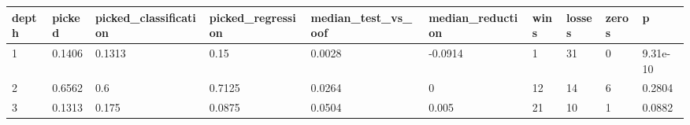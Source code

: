 \begin{tabular}{llllllllll}
\toprule
depth & picked & picked\_classification & picked\_regression & median\_test\_vs\_oof & median\_reduction & wins & losses & zeros & p \\
\midrule
1 & 0.1406 & 0.1313 & 0.15 & 0.0028 & -0.0914 & 1 & 31 & 0 & 9.31e-10 \\
2 & 0.6562 & 0.6 & 0.7125 & 0.0264 & 0 & 12 & 14 & 6 & 0.2804 \\
3 & 0.1313 & 0.175 & 0.0875 & 0.0504 & 0.005 & 21 & 10 & 1 & 0.0882 \\
\bottomrule
\end{tabular}
